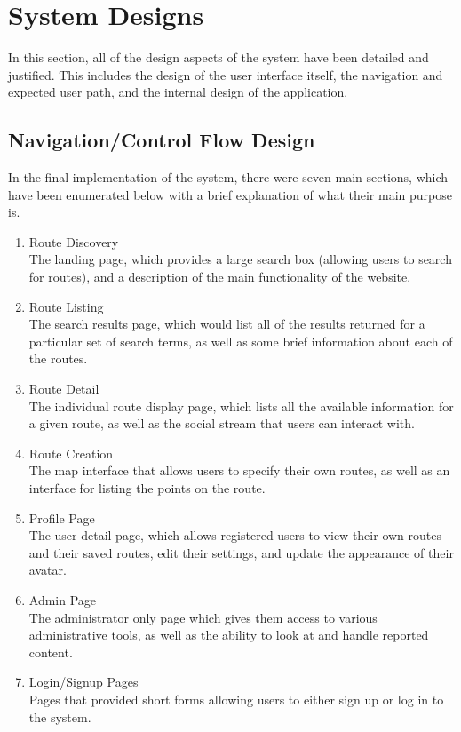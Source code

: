\section{System Designs}
In this section, all of the design aspects of the system have been detailed and justified. This includes the design of the user interface itself, the navigation and expected user path, and the internal design of the application.

\subsection{Navigation/Control Flow Design}
In the final implementation of the system, there were seven main sections, which have been enumerated below with a brief explanation of what their main purpose is.

\begin{enumerate}
	\item Route Discovery \ \\
	The landing page, which provides a large search box (allowing users to search for routes), and a description of the main functionality of the website.
	\item Route Listing \ \\
	The search results page, which would list all of the results returned for a particular set of search terms, as well as some brief information about each of the routes.
	\item Route Detail\ \\
	The individual route display page, which lists all the available information for a given route, as well as the social stream that users can interact with.
	\item Route Creation\ \\
	The map interface that allows users to specify their own routes, as well as an interface for listing the points on the route.
	\item Profile Page\ \\
	The user detail page, which allows registered users to view their own routes and their saved routes, edit their settings, and update the appearance of their avatar.
	\item Admin Page\ \\
	The administrator only page which gives them access to various administrative tools, as well as the ability to look at and handle reported content.
	\item Login/Signup Pages\ \\
	Pages that provided short forms allowing users to either sign up or log in to the system.
\end{enumerate}
